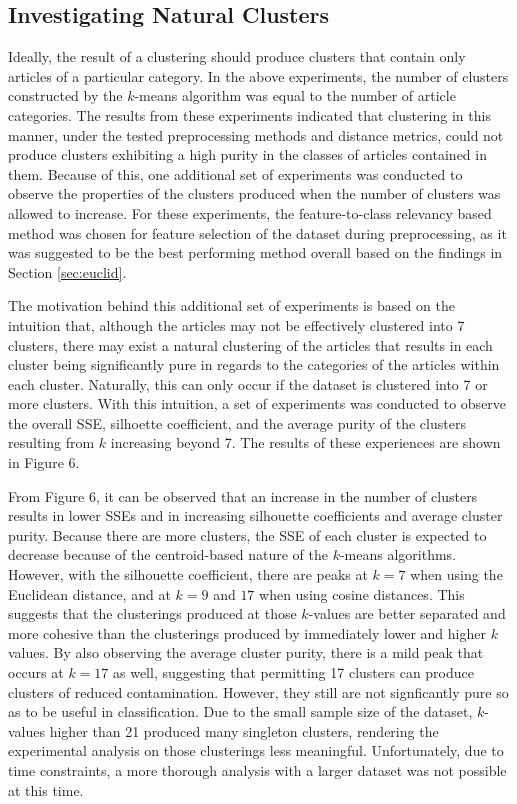 \documentclass[11pt]{article}
\begin{document}
\subsection{Investigating Natural Clusters}

Ideally, the result of a clustering should produce clusters that contain only articles of a particular category.
In the above experiments, the number of clusters constructed by the $k$-means algorithm was equal to the number of article categories.
The results from these experiments indicated that clustering in this manner, under the tested preprocessing methods and distance metrics, could not produce clusters exhibiting a high purity in the classes of articles contained in them.
Because of this, one additional set of experiments was conducted to observe the properties of the clusters produced when the number of clusters was allowed to increase.
For these experiments, the feature-to-class relevancy based method was chosen for feature selection of the dataset during preprocessing, as it was suggested to be the best performing method overall based on the findings in Section \ref{sec:euclid}.

The motivation behind this additional set of experiments is based on the intuition that, although the articles may not be effectively clustered into 7 clusters, there may exist a natural clustering of the articles that results in each cluster being significantly pure in regards to the categories of the articles within each cluster.
Naturally, this can only occur if the dataset is clustered into 7 or more clusters.
With this intuition, a set of experiments was conducted to observe the overall SSE, silhoette coefficient, and the average purity of the clusters resulting from $k$ increasing beyond 7.
The results of these experiences are shown in Figure 6.

From Figure 6, it can be observed that an increase in the number of clusters results in lower SSEs and in increasing silhouette coefficients and average cluster purity.
Because there are more clusters, the SSE of each cluster is expected to decrease because of the centroid-based nature of the $k$-means algorithms.
However, with the silhouette coefficient, there are peaks at $k = 7$ when using the Euclidean distance, and at $k = 9$ and $17$ when using cosine distances.
This suggests that the clusterings produced at those $k$-values are better separated and more cohesive than the clusterings produced by immediately lower and higher $k$ values.
By also observing the average cluster purity, there is a mild peak that occurs at $k = 17$ as well, suggesting that permitting 17 clusters can produce clusters of reduced contamination.
However, they still are not signficantly pure so as to be useful in classification.
Due to the small sample size of the dataset, $k$-values higher than 21 produced many singleton clusters, rendering the experimental analysis on those clusterings less meaningful.
Unfortunately, due to time constraints, a more thorough analysis with a larger dataset was not possible at this time.
\end{document}
